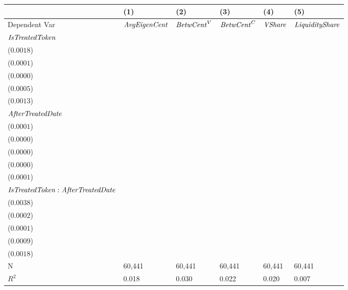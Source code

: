 \begin{tabular}{llllll}
\toprule
{} &                                      (1) &                                      (2) &                                      (3) &                                      (4) &                                      (5) \\
\midrule
Dependent Var                                 &                     ${\it AvgEigenCent}$ &                       ${\it BetwCent}^V$ &                       ${\it BetwCent}^C$ &                           ${\it VShare}$ &                   ${\it LiquidityShare}$ \\
${\it IsTreatedToken}$                        &  \makecell{$0.0124^{***}$ \\ ($0.0018$)} &  \makecell{$0.0004^{***}$ \\ ($0.0001$)} &  \makecell{$0.0001^{***}$ \\ ($0.0000$)} &  \makecell{$0.0034^{***}$ \\ ($0.0005$)} &  \makecell{$0.0079^{***}$ \\ ($0.0013$)} \\
${\it AfterTreatedDate}$                      &  \makecell{$0.0022^{***}$ \\ ($0.0001$)} &  \makecell{$0.0000^{***}$ \\ ($0.0000$)} &  \makecell{$0.0000^{***}$ \\ ($0.0000$)} &  \makecell{$0.0006^{***}$ \\ ($0.0000$)} &  \makecell{$0.0009^{***}$ \\ ($0.0001$)} \\
${\it IsTreatedToken}:{\it AfterTreatedDate}$ &     \makecell{$0.0036^{}$ \\ ($0.0038$)} &    \makecell{$-0.0000^{}$ \\ ($0.0002$)} &     \makecell{$0.0000^{}$ \\ ($0.0001$)} &     \makecell{$0.0009^{}$ \\ ($0.0009$)} &    \makecell{$-0.0008^{}$ \\ ($0.0018$)} \\
\midrule N                                    &                                   60,441 &                                   60,441 &                                   60,441 &                                   60,441 &                                   60,441 \\
$R^2$                                         &                                    0.018 &                                    0.030 &                                    0.022 &                                    0.020 &                                    0.007 \\
\bottomrule
\end{tabular}
